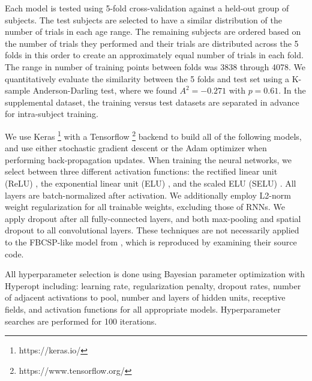 \documentclass[fleqn,10pt]{wlscirep}
\begin{document}
Each model is tested using 5-fold cross-validation against a held-out group of subjects. The test subjects are selected to have a similar distribution of the number of trials in each age range. The remaining subjects are ordered based on the number of trials they performed and their trials are distributed across the 5 folds in this order to create an approximately equal number of trials in each fold. The range in number of training points between folds was 3838 through 4078. We quantitatively evaluate the similarity between the 5 folds and test set using a K-sample Anderson-Darling test, where we found $A^2=-0.271$ with $p=0.61$. In the supplemental dataset, the training versus test datasets are separated in advance for intra-subject training.

We use Keras \footnote{https://keras.io/} with a Tensorflow \footnote{https://www.tensorflow.org/} backend to build all of the following models, and use either stochastic gradient descent or the Adam optimizer\cite{Kingma2015} when performing back-propagation updates. When training the neural networks, we select between three different activation functions: the rectified linear unit (ReLU) \cite{He2015a}, the exponential linear unit (ELU) \cite{Clevert}, and the scaled ELU (SELU) \cite{NIPS2017_6698}. All layers are batch-normalized \cite{Szegedy2015} after activation. We additionally employ L2-norm weight regularization for all trainable weights, excluding those of RNNs. We apply dropout \cite{Srivastava2014} after all fully-connected layers, and both max-pooling and spatial dropout \cite{Tompson2015} to all convolutional layers. These techniques are not necessarily applied to the FBCSP-like model from \cite{Schirrmeister2017}, which is reproduced by examining their source code.

All hyperparameter selection is done using Bayesian parameter optimization with Hyperopt \cite{Bergstra2013} including: learning rate, regularization penalty, dropout rates, number of adjacent activations to pool, number and layers of hidden units, receptive fields, and activation functions for all appropriate models. Hyperparameter searches are performed for 100 iterations.



\end{document}
